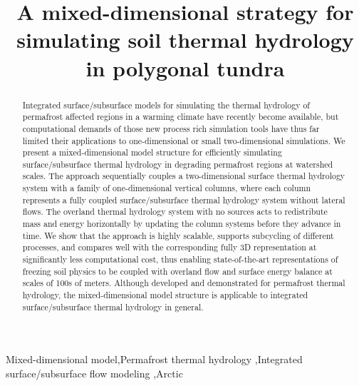 \documentclass[review]{elsarticle}
\begin{document}
\begin{frontmatter}

\title{A mixed-dimensional strategy for simulating soil thermal hydrology in polygonal tundra}





\begin{abstract}
Integrated surface/subsurface models for simulating the thermal hydrology of permafrost affected regions in a warming climate have recently become available, but computational demands of those new process rich simulation tools have thus far limited their applications to one-dimensional or small two-dimensional simulations. 
We present a mixed-dimensional model structure for efficiently simulating surface/subsurface thermal hydrology in degrading permafrost regions at watershed scales. The approach sequentially couples a two-dimensional surface thermal hydrology system with a family of one-dimensional vertical columns, where each column represents a fully coupled surface/subsurface thermal hydrology system without lateral flows. The overland thermal hydrology system with no sources acts to redistribute mass and energy horizontally by updating the column systems before they advance  in time. We show that the approach is highly scalable, supports subcycling of different processes, and compares well with the corresponding fully 3D representation at significantly less computational cost, thus enabling state-of-the-art representations of freezing soil physics to be coupled with overland flow and surface energy balance at scales of 100s of meters. Although developed and demonstrated for permafrost thermal hydrology, the mixed-dimensional model structure is applicable to integrated surface/subsurface thermal hydrology in general. 
\end{abstract}

\begin{keyword}
Mixed-dimensional model\sep Permafrost thermal hydrology  \sep Integrated surface/subsurface flow modeling \sep Arctic 
\end{keyword}
\end{frontmatter}
\end{document}
